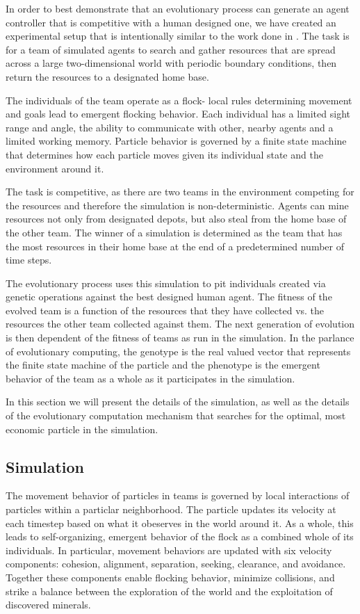 \documentclass[12pt,journal,compsoc]{IEEEtran}
\begin{document}
In order to best demonstrate that an evolutionary process can generate an agent controller that is competitive with a human designed one, we have created an experimental setup that is intentionally similar to the work done in \cite{rodriguez2004extending}. The task is for a team of simulated agents to search and gather resources that are spread across a large two-dimensional world with periodic boundary conditions, then return the resources to a designated home base.

The individuals of the team operate as a flock- local rules determining movement and goals lead to emergent flocking behavior. Each individual has a limited sight range and angle, the ability to communicate with other, nearby agents and a limited working memory. Particle behavior is governed by a finite state machine that determines how each particle moves given its individual state and the environment around it.

The task is competitive, as there are two teams in the environment competing for the resources and therefore the simulation is non-deterministic. Agents can mine resources not only from designated depots, but also steal from the home base of the other team. The winner of a simulation is determined as the team that has the most resources in their home base at the end of a predetermined number of time steps.

The evolutionary process uses this simulation to pit individuals created via genetic operations against the best designed human agent. The fitness of the evolved team is a function of the resources that they have collected vs. the resources the other team collected against them. The next generation of evolution is then dependent of the fitness of teams as run in the simulation. In the parlance of evolutionary computing, the genotype is the real valued vector that represents the finite state machine of the particle and the phenotype is the emergent behavior of the team as a whole as it participates in the simulation.

In this section we will present the details of the simulation, as well as the details of the evolutionary computation mechanism that searches for the optimal, most economic particle in the simulation.

\subsection{Simulation}

The movement behavior of particles in teams is governed by local interactions of particles within a particlar neighborhood. The particle updates its velocity at each timestep based on what it obeserves in the world around it. As a whole, this leads to self-organizing, emergent behavior of the flock as a combined whole of its individuals. In particular, movement behaviors are updated with six velocity components: cohesion, alignment, separation, seeking, clearance, and avoidance. Together these components enable flocking behavior, minimize collisions, and strike a balance between the exploration of the world and the exploitation of discovered minerals.
\end{document}
